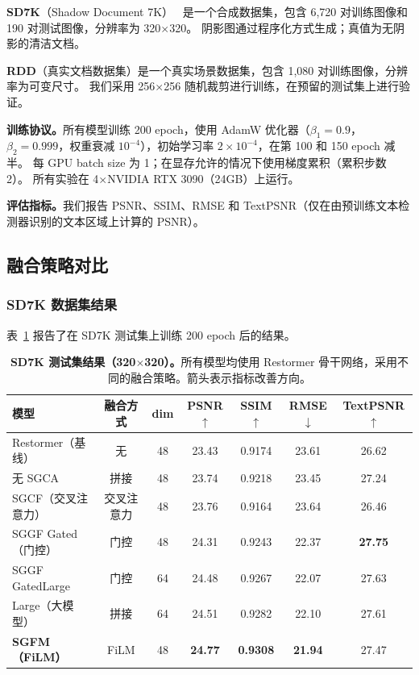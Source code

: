 \documentclass[11pt]{ctexart}
\begin{document}
\textbf{SD7K}（Shadow Document 7K）~\cite{li2023single} 是一个合成数据集，包含 6,720 对训练图像和 190 对测试图像，分辨率为 320$\times$320。
阴影图通过程序化方式生成；真值为无阴影的清洁文档。

\textbf{RDD}（真实文档数据集）是一个真实场景数据集，包含 1,080 对训练图像，分辨率为可变尺寸。
我们采用 256$\times$256 随机裁剪进行训练，在预留的测试集上进行验证。

\textbf{训练协议。}所有模型训练 200 epoch，使用 AdamW 优化器（$\beta_1=0.9$，$\beta_2=0.999$，权重衰减 $10^{-4}$），初始学习率 $2\times10^{-4}$，在第 100 和 150 epoch 减半。
每 GPU batch size 为 1；在显存允许的情况下使用梯度累积（累积步数 2）。
所有实验在 4$\times$NVIDIA RTX 3090（24GB）上运行。

\textbf{评估指标。}我们报告 PSNR、SSIM、RMSE 和 TextPSNR（仅在由预训练文本检测器识别的文本区域上计算的 PSNR）。

\subsection{融合策略对比}

\subsubsection{SD7K 数据集结果}

表~\ref{tab:sd7k} 报告了在 SD7K 测试集上训练 200 epoch 后的结果。

\begin{table}[t]
\centering
\caption{\textbf{SD7K 测试集结果（320$\times$320）。}所有模型均使用 Restormer 骨干网络，采用不同的融合策略。箭头表示指标改善方向。}
\label{tab:sd7k}
\begin{tabular}{@{}lcccccc@{}}
\toprule
\textbf{模型} & \textbf{融合方式} & \textbf{dim} & \textbf{PSNR$\uparrow$} & \textbf{SSIM$\uparrow$} & \textbf{RMSE$\downarrow$} & \textbf{TextPSNR$\uparrow$} \\
\midrule
Restormer（基线）     & 无          & 48 & 23.43 & 0.9174 & 23.61 & 26.62 \\
无 SGCA               & 拼接        & 48 & 23.74 & 0.9218 & 23.45 & 27.24 \\
SGCF（交叉注意力）    & 交叉注意力  & 48 & 23.76 & 0.9164 & 23.64 & 26.46 \\
SGGF Gated（门控）    & 门控        & 48 & 24.31 & 0.9243 & 22.37 & \textbf{27.75} \\
SGGF GatedLarge       & 门控        & 64 & 24.48 & 0.9267 & 22.07 & 27.63 \\
Large（大模型）       & 拼接        & 64 & 24.51 & 0.9282 & 22.10 & 27.61 \\
\rowcolor{gray!15}
\textbf{SGFM（FiLM）}  & FiLM        & 48 & \textbf{24.77} & \textbf{0.9308} & \textbf{21.94} & 27.47 \\
\bottomrule
\end{tabular}
\end{table}
\end{document}
